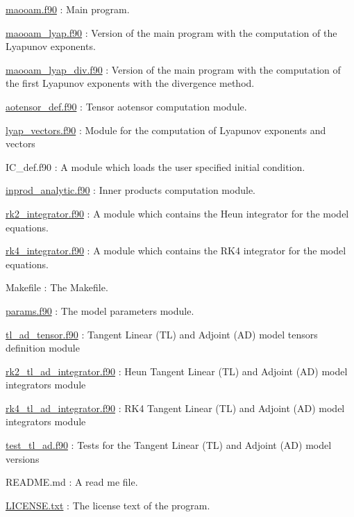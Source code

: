 \begin{DoxyItemize}
\item \hyperlink{maooam_8f90}{maooam.\+f90} \+: Main program.
\item \hyperlink{maooam__lyap_8f90}{maooam\+\_\+lyap.\+f90} \+: Version of the main program with the computation of the Lyapunov exponents.
\item \hyperlink{maooam__lyap__div_8f90}{maooam\+\_\+lyap\+\_\+div.\+f90} \+: Version of the main program with the computation of the first Lyapunov exponents with the divergence method.
\item \hyperlink{aotensor__def_8f90}{aotensor\+\_\+def.\+f90} \+: Tensor aotensor computation module.
\item \hyperlink{lyap__vectors_8f90}{lyap\+\_\+vectors.\+f90} \+: Module for the computation of Lyapunov exponents and vectors
\item I\+C\+\_\+def.\+f90 \+: A module which loads the user specified initial condition.
\item \hyperlink{inprod__analytic_8f90}{inprod\+\_\+analytic.\+f90} \+: Inner products computation module.
\item \hyperlink{rk2__integrator_8f90}{rk2\+\_\+integrator.\+f90} \+: A module which contains the Heun integrator for the model equations.
\item \hyperlink{rk4__integrator_8f90}{rk4\+\_\+integrator.\+f90} \+: A module which contains the R\+K4 integrator for the model equations.
\item Makefile \+: The Makefile.
\item \hyperlink{params_8f90}{params.\+f90} \+: The model parameters module.
\item \hyperlink{tl__ad__tensor_8f90}{tl\+\_\+ad\+\_\+tensor.\+f90} \+: Tangent Linear (TL) and Adjoint (AD) model tensors definition module
\item \hyperlink{rk2__tl__ad__integrator_8f90}{rk2\+\_\+tl\+\_\+ad\+\_\+integrator.\+f90} \+: Heun Tangent Linear (TL) and Adjoint (AD) model integrators module
\item \hyperlink{rk4__tl__ad__integrator_8f90}{rk4\+\_\+tl\+\_\+ad\+\_\+integrator.\+f90} \+: R\+K4 Tangent Linear (TL) and Adjoint (AD) model integrators module
\item \hyperlink{test__tl__ad_8f90}{test\+\_\+tl\+\_\+ad.\+f90} \+: Tests for the Tangent Linear (TL) and Adjoint (AD) model versions
\item R\+E\+A\+D\+M\+E.\+md \+: A read me file.
\item \hyperlink{LICENSE_8txt}{L\+I\+C\+E\+N\+S\+E.\+txt} \+: The license text of the program.

\end{DoxyItemize}
